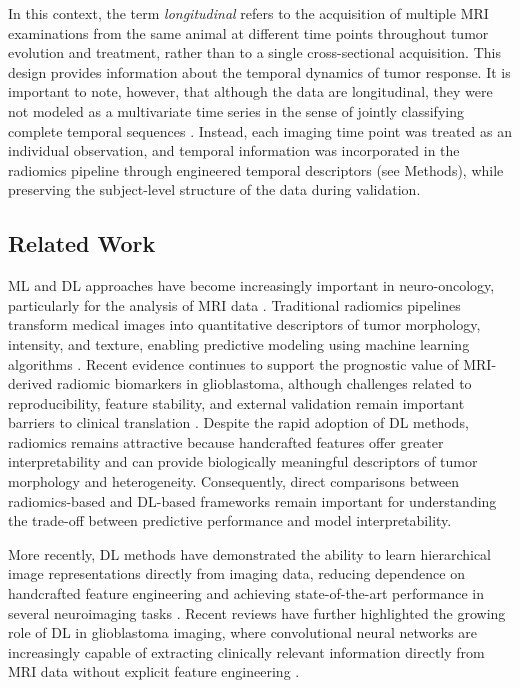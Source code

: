 \documentclass{article}
\begin{document}
In this context, the term \textit{longitudinal} refers to the acquisition of multiple MRI examinations from the same animal at different time points throughout tumor evolution and treatment, rather than to a single cross-sectional acquisition. This design provides information about the temporal dynamics of tumor response. It is important to note, however, that although the data are longitudinal, they were not modeled as a multivariate time series in the sense of jointly classifying complete temporal sequences \cite{Prinzi2024}. Instead, each imaging time point was treated as an individual observation, and temporal information was incorporated in the radiomics pipeline through engineered temporal descriptors (see Methods), while preserving the subject-level structure of the data during validation.

\subsection*{Related Work}
ML and DL approaches have become increasingly important in neuro-oncology, particularly for the analysis of MRI data \cite{Pitarch24}. Traditional radiomics pipelines transform medical images into quantitative descriptors of tumor morphology, intensity, and texture, enabling predictive modeling using machine learning algorithms \cite{kumar2012radiomics,pyradiomics}. Recent evidence continues to support the prognostic value of MRI-derived radiomic biomarkers in glioblastoma, although challenges related to reproducibility, feature stability, and external validation remain important barriers to clinical translation \cite{PMID:38668068}. Despite the rapid adoption of DL methods, radiomics remains attractive because handcrafted features offer greater interpretability and can provide biologically meaningful descriptors of tumor morphology and heterogeneity. Consequently, direct comparisons between radiomics-based and DL-based frameworks remain important for understanding the trade-off between predictive performance and model interpretability.

More recently, DL methods have demonstrated the ability to learn hierarchical image representations directly from imaging data, reducing dependence on handcrafted feature engineering and achieving state-of-the-art performance in several neuroimaging tasks \cite{Hosny2018,Shen2017,Tran2021,Dorfner2025}. Recent reviews have further highlighted the growing role of DL in glioblastoma imaging, where convolutional neural networks are increasingly capable of extracting clinically relevant information directly from MRI data without explicit feature engineering \cite{biomedicines12081878}.
\end{document}
